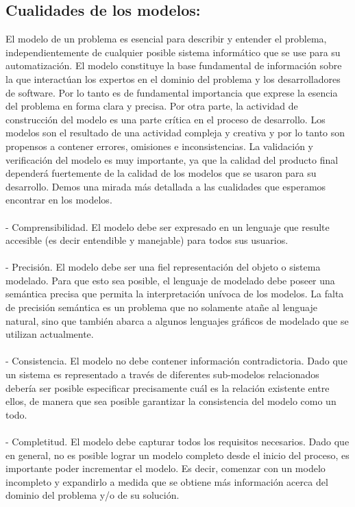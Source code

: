 \subsection{Cualidades de los modelos:}
 El modelo de un problema es esencial para describir y entender el problema, independientemente de cualquier posible sistema informático que se use para su automatización. El modelo constituye la base fundamental de información sobre la que interactúan los expertos en el dominio del problema y los desarrolladores de software. Por lo tanto es de fundamental importancia que exprese la esencia del problema en forma clara y precisa. Por otra parte, la actividad de construcción del modelo es una parte crítica en el proceso de desarrollo. Los modelos son el resultado de una actividad compleja y creativa y por lo tanto son propensos a contener errores, omisiones e inconsistencias. La validación y verificación del modelo es muy importante, ya que la calidad del producto final dependerá fuertemente de la calidad de los modelos que se usaron para su desarrollo. Demos una mirada más detallada a las cualidades que esperamos encontrar en los modelos.\\\\ 
- Comprensibilidad. El modelo debe ser expresado en un lenguaje que resulte accesible (es decir entendible y manejable) para todos sus usuarios. \\\\
- Precisión. El modelo debe ser una fiel representación del objeto o sistema modelado. Para que esto sea posible, el lenguaje de modelado debe poseer una semántica precisa que permita la interpretación unívoca de los modelos. La falta de precisión semántica es un problema que no solamente atañe al lenguaje natural, sino que también abarca a algunos lenguajes gráficos de modelado que se utilizan actualmente.\\\\
- Consistencia. El modelo no debe contener información contradictoria. Dado que un sistema es representado a través de diferentes sub-modelos relacionados debería ser posible especificar precisamente cuál es la relación existente entre ellos, de manera que sea posible garantizar la consistencia del modelo como un todo. \\\\
- Completitud. El modelo debe capturar todos los requisitos necesarios. Dado que en general, no es posible lograr un modelo completo desde el inicio del proceso, es importante poder incrementar el modelo. Es decir, comenzar con un modelo incompleto y expandirlo a medida que se obtiene más información acerca del dominio del problema y/o de su solución.\\\\ 
